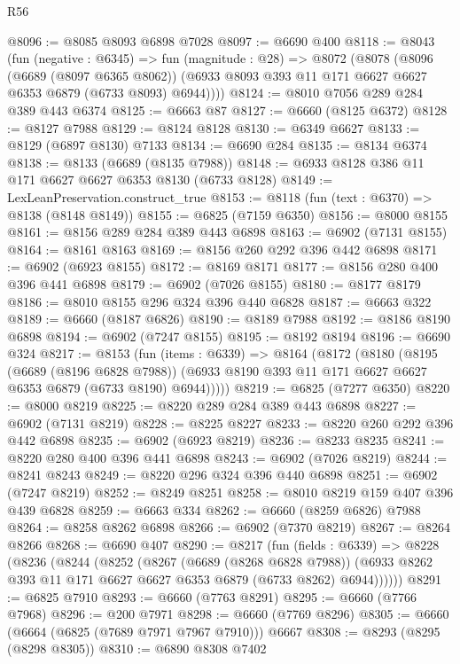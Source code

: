 \begin{lexlean}{R56}
\begin{coremodule}
@8096 := @8085 @8093 @6898 @7028
@8097 := @6690 @400
@8118 := @8043
    (fun (negative : @6345) =>
    fun (magnitude : @28) =>
    @8072
      (@8078
        (@8096
          (@6689 (@8097 @6365 @8062))
          (@6933 @8093 @393 @11 @171 @6627 @6627 @6353 @6879 (@6733 @8093) @6944))))
@8124 := @8010 @7056 @289 @284 @389 @443 @6374
@8125 := @6663 @87
@8127 := @6660 (@8125 @6372)
@8128 := @8127 @7988
@8129 := @8124 @8128
@8130 := @6349 @6627
@8133 := @8129 (@6897 @8130) @7133
@8134 := @6690 @284
@8135 := @8134 @6374
@8138 := @8133 (@6689 (@8135 @7988))
@8148 := @6933 @8128 @386 @11 @171 @6627 @6627 @6353 @8130 (@6733 @8128)
@8149 := LexLeanPreservation.construct_true
@8153 := @8118 (fun (text : @6370) => @8138 (@8148 @8149))
@8155 := @6825 (@7159 @6350)
@8156 := @8000 @8155
@8161 := @8156 @289 @284 @389 @443 @6898
@8163 := @6902 (@7131 @8155)
@8164 := @8161 @8163
@8169 := @8156 @260 @292 @396 @442 @6898
@8171 := @6902 (@6923 @8155)
@8172 := @8169 @8171
@8177 := @8156 @280 @400 @396 @441 @6898
@8179 := @6902 (@7026 @8155)
@8180 := @8177 @8179
@8186 := @8010 @8155 @296 @324 @396 @440 @6828
@8187 := @6663 @322
@8189 := @6660 (@8187 @6826)
@8190 := @8189 @7988
@8192 := @8186 @8190 @6898
@8194 := @6902 (@7247 @8155)
@8195 := @8192 @8194
@8196 := @6690 @324
@8217 := @8153
    (fun (items : @6339) =>
    @8164
      (@8172
        (@8180
          (@8195
            (@6689 (@8196 @6828 @7988))
            (@6933 @8190 @393 @11 @171 @6627 @6627 @6353 @6879 (@6733 @8190) @6944)))))
@8219 := @6825 (@7277 @6350)
@8220 := @8000 @8219
@8225 := @8220 @289 @284 @389 @443 @6898
@8227 := @6902 (@7131 @8219)
@8228 := @8225 @8227
@8233 := @8220 @260 @292 @396 @442 @6898
@8235 := @6902 (@6923 @8219)
@8236 := @8233 @8235
@8241 := @8220 @280 @400 @396 @441 @6898
@8243 := @6902 (@7026 @8219)
@8244 := @8241 @8243
@8249 := @8220 @296 @324 @396 @440 @6898
@8251 := @6902 (@7247 @8219)
@8252 := @8249 @8251
@8258 := @8010 @8219 @159 @407 @396 @439 @6828
@8259 := @6663 @334
@8262 := @6660 (@8259 @6826) @7988
@8264 := @8258 @8262 @6898
@8266 := @6902 (@7370 @8219)
@8267 := @8264 @8266
@8268 := @6690 @407
@8290 := @8217
    (fun (fields : @6339) =>
    @8228
      (@8236
        (@8244
          (@8252
            (@8267
              (@6689 (@8268 @6828 @7988))
              (@6933 @8262 @393 @11 @171 @6627 @6627 @6353 @6879 (@6733 @8262) @6944))))))
@8291 := @6825 @7910
@8293 := @6660 (@7763 @8291)
@8295 := @6660 (@7766 @7968)
@8296 := @200 @7971
@8298 := @6660 (@7769 @8296)
@8305 := @6660 (@6664 (@6825 (@7689 @7971 @7967 @7910))) @6667
@8308 := @8293 (@8295 (@8298 @8305))
@8310 := @6890 @8308 @7402

\end{coremodule}
\end{lexlean}
